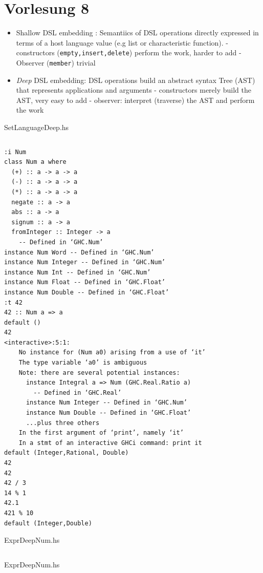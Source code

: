 \documentclass{article}
\newcommand{\Haskell}[1]{\texttt{#1}}
\begin{document}
\section{Vorlesung 8}
\begin{itemize}
\item Shallow DSL embedding : Semantiics of DSL operations directly expressed in terms of a host language value (e.g list or characteristic function).
\subitem- constructors (\Haskell{empty,insert,delete}) perform the work, harder to add
\subitem- Observer (\Haskell{member}) trivial
\item \emph{Deep} DSL embedding: DSL operations build an abstract syntax Tree (AST) that represents applications and arguments
\subitem- constructors merely build the AST, very easy to add
\subitem- observer: interpret (traverse) the AST and perform the work
\end{itemize}
\begin{listing}[h!]
\caption{SetLanguageDeep.hs}
\inputminted{Haskell}{SetLanguageDeep.hs}
\end{listing}
\begin{verbatim}
:i Num
class Num a where
  (+) :: a -> a -> a
  (-) :: a -> a -> a
  (*) :: a -> a -> a
  negate :: a -> a
  abs :: a -> a
  signum :: a -> a
  fromInteger :: Integer -> a
  	-- Defined in ‘GHC.Num’
instance Num Word -- Defined in ‘GHC.Num’
instance Num Integer -- Defined in ‘GHC.Num’
instance Num Int -- Defined in ‘GHC.Num’
instance Num Float -- Defined in ‘GHC.Float’
instance Num Double -- Defined in ‘GHC.Float’
:t 42
42 :: Num a => a
default ()
42
<interactive>:5:1:
    No instance for (Num a0) arising from a use of ‘it’
    The type variable ‘a0’ is ambiguous
    Note: there are several potential instances:
      instance Integral a => Num (GHC.Real.Ratio a)
        -- Defined in ‘GHC.Real’
      instance Num Integer -- Defined in ‘GHC.Num’
      instance Num Double -- Defined in ‘GHC.Float’
      ...plus three others
    In the first argument of ‘print’, namely ‘it’
    In a stmt of an interactive GHCi command: print it
default (Integer,Rational, Double)
42
42
42 / 3
14 % 1
42.1
421 % 10
default (Integer,Double)
\end{verbatim}
\begin{listing}[h!]
\caption{ExprDeepNum.hs}
\inputminted{Haskell}{ExprDeepNum.hs}
\end{listing}
\begin{listing}[h!]
\caption{ExprDeepNum.hs}
\inputminted{Haskell}{ExprDeep.hs}
\end{listing}
\clearpage
\end{document}
